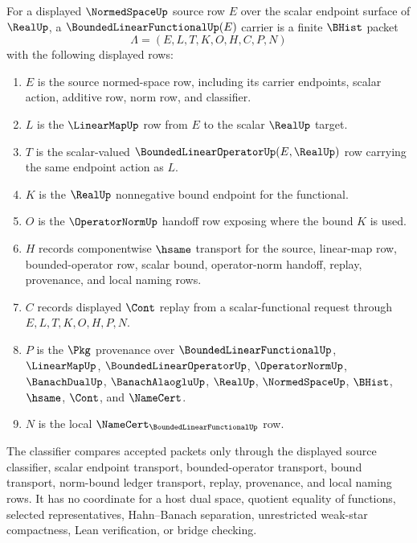 \begin{definition}
\label{def:bounded-linear-functional-carrier}
For a displayed $\NormedSpaceUp$ source row $E$ over the scalar endpoint surface of $\RealUp$, a $\BoundedLinearFunctionalUp(E)$ carrier is a finite $\BHist$ packet
$$
\Lambda=(E,L,T,K,O,H,C,P,N)
$$
with the following displayed rows:
\begin{enumerate}
\item $E$ is the source normed-space row, including its carrier endpoints, scalar action, additive row, norm row, and classifier.
\item $L$ is the $\LinearMapUp$ row from $E$ to the scalar $\RealUp$ target.
\item $T$ is the scalar-valued $\BoundedLinearOperatorUp(E,\RealUp)$ row carrying the same endpoint action as $L$.
\item $K$ is the $\RealUp$ nonnegative bound endpoint for the functional.
\item $O$ is the $\OperatorNormUp$ handoff row exposing where the bound $K$ is used.
\item $H$ records componentwise $\hsame$ transport for the source, linear-map row, bounded-operator row, scalar bound, operator-norm handoff, replay, provenance, and local naming rows.
\item $C$ records displayed $\Cont$ replay from a scalar-functional request through $E,L,T,K,O,H,P,N$.
\item $P$ is the $\Pkg$ provenance over $\BoundedLinearFunctionalUp$, $\LinearMapUp$, $\BoundedLinearOperatorUp$, $\OperatorNormUp$, $\BanachDualUp$, $\BanachAlaogluUp$, $\RealUp$, $\NormedSpaceUp$, $\BHist$, $\hsame$, $\Cont$, and $\NameCert$.
\item $N$ is the local $\NameCert_{\BoundedLinearFunctionalUp}$ row.
\end{enumerate}
The classifier compares accepted packets only through the displayed source classifier, scalar endpoint transport, bounded-operator transport, bound transport, norm-bound ledger transport, replay, provenance, and local naming rows. It has no coordinate for a host dual space, quotient equality of functions, selected representatives, Hahn--Banach separation, unrestricted weak-star compactness, Lean verification, or bridge checking.
\end{definition}

